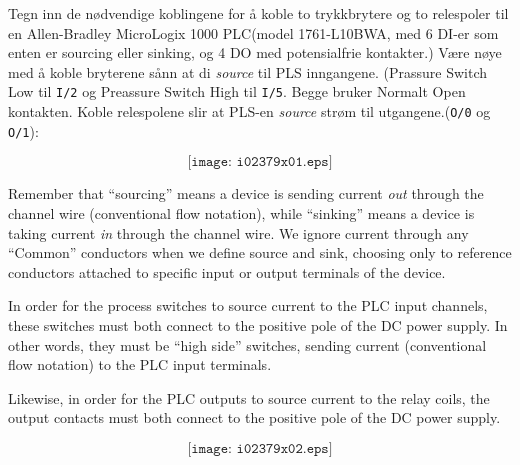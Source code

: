 

Tegn inn de nødvendige koblingene for å koble to trykkbrytere og to relespoler til en Allen-Bradley MicroLogix 1000 PLC(model 1761-L10BWA, med 6 DI-er som enten er sourcing eller sinking, og 4 DO med potensialfrie kontakter.) Være nøye med å koble bryterene sånn at di \textit{source} til PLS inngangene. (Prassure Switch Low til \texttt{I/2} og Preassure Switch High til \texttt{I/5}. Begge bruker Normalt Open  kontakten. Koble relespolene slir at PLS-en \textit{source} strøm til utgangene.(\texttt{O/0} og \texttt{O/1}):


\vskip 50pt

$$\texttt{[image: i02379x01.eps]}$$

\vfil

\eject






Remember that ``sourcing'' means a device is sending current {\it out} through the channel wire (conventional flow notation), while ``sinking'' means a device is taking current {\it in} through the channel wire.  We ignore current through any ``Common'' conductors when we define source and sink, choosing only to reference conductors attached to specific input or output terminals of the device.

\vskip 10pt

In order for the process switches to source current to the PLC input channels, these switches must both connect to the positive pole of the DC power supply.  In other words, they must be ``high side'' switches, sending current (conventional flow notation) to the PLC input terminals.

\vskip 10pt

Likewise, in order for the PLC outputs to source current to the relay coils, the output contacts must both connect to the positive pole of the DC power supply.

$$\texttt{[image: i02379x02.eps]}$$












